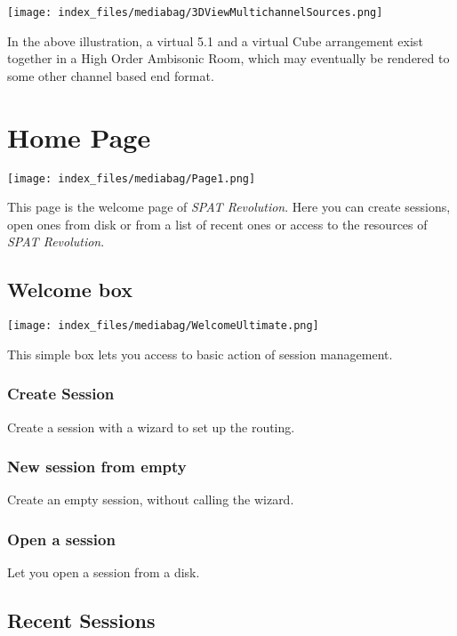 \documentclass[
  letterpaper,
  DIV=11,
  numbers=noendperiod]{scrreport}
\begin{document}
\texttt{[image: index\_files/mediabag/3DViewMultichannelSources.png]}

In the above illustration, a virtual 5.1 and a virtual Cube arrangement
exist together in a High Order Ambisonic Room, which may eventually be
rendered to some other channel based end format.

\hypertarget{home-page}{%
\chapter{Home Page}\label{home-page}}

\texttt{[image: index\_files/mediabag/Page1.png]}

This page is the welcome page of \emph{SPAT Revolution}. Here you can
create sessions, open ones from disk or from a list of recent ones or
access to the resources of \emph{SPAT Revolution}.

\hypertarget{welcome-box}{%
\section{Welcome box}\label{welcome-box}}

\texttt{[image: index\_files/mediabag/WelcomeUltimate.png]}

This simple box lets you access to basic action of session management.

\hypertarget{create-session}{%
\subsection{Create Session}\label{create-session}}

Create a session with a wizard to set up the routing.

\hypertarget{new-session-from-empty}{%
\subsection{New session from empty}\label{new-session-from-empty}}

Create an empty session, without calling the wizard.

\hypertarget{open-a-session}{%
\subsection{Open a session}\label{open-a-session}}

Let you open a session from a disk.

\hypertarget{recent-sessions}{%
\section{Recent Sessions}\label{recent-sessions}}
\end{document}
